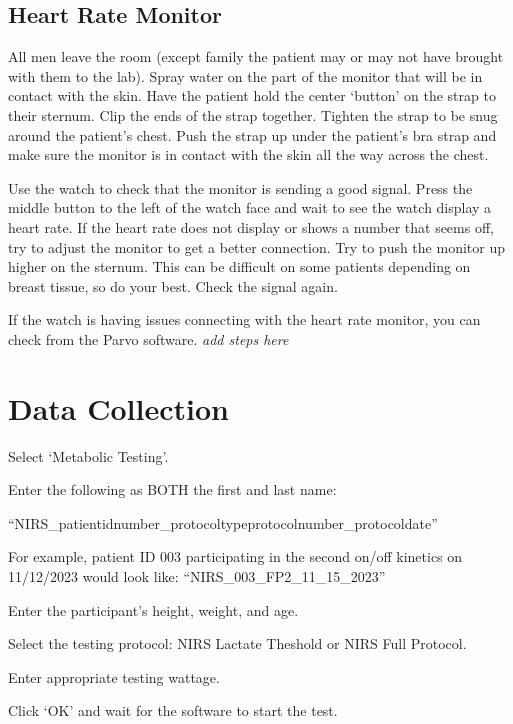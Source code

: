 \documentclass[
]{book}
\begin{document}
\hypertarget{Parvo-HeartRateMonitor}{%
\subsection{Heart Rate Monitor}\label{Parvo-HeartRateMonitor}}

All men leave the room (except family the patient may or may not have brought with them to the lab). Spray water on the part of the monitor that will be in contact with the skin. Have the patient hold the center `button' on the strap to their sternum. Clip the ends of the strap together. Tighten the strap to be snug around the patient's chest. Push the strap up under the patient's bra strap and make sure the monitor is in contact with the skin all the way across the chest.

Use the watch to check that the monitor is sending a good signal. Press the middle button to the left of the watch face and wait to see the watch display a heart rate. If the heart rate does not display or shows a number that seems off, try to adjust the monitor to get a better connection. Try to push the monitor up higher on the sternum. This can be difficult on some patients depending on breast tissue, so do your best. Check the signal again.

If the watch is having issues connecting with the heart rate monitor, you can check from the Parvo software. \emph{add steps here}

\hypertarget{Parvo-DataCollection}{%
\section{Data Collection}\label{Parvo-DataCollection}}

Select `Metabolic Testing'.

Enter the following as BOTH the first and last name:

``NIRS\_patientidnumber\_protocoltypeprotocolnumber\_protocoldate''

For example, patient ID 003 participating in the second on/off kinetics on 11/12/2023 would look like:
``NIRS\_003\_FP2\_11\_15\_2023''

Enter the participant's height, weight, and age.

Select the testing protocol: NIRS Lactate Theshold or NIRS Full Protocol.

Enter appropriate testing wattage.

Click `OK' and wait for the software to start the test.
\end{document}
